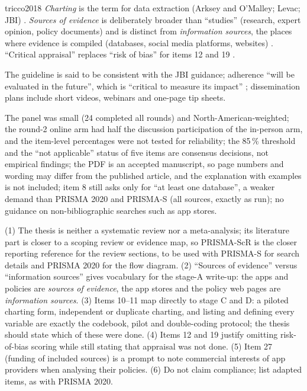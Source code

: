 \begin{papercard}{tricco2018}
 \emph{Charting} is the term for data extraction (Arksey and O'Malley; Levac; JBI) . \emph{Sources of evidence} is deliberately broader than ``studies'' (research, expert opinion, policy documents) and is distinct from \emph{information sources}, the places where evidence is compiled (databases, social media platforms, websites) . ``Critical appraisal'' replaces ``risk of bias'' for items 12 and 19 .

 The guideline is said to be consistent with the JBI guidance; adherence ``will be evaluated in the future'', which is ``critical to measure its impact'' ; dissemination plans include short videos, webinars and one-page tip sheets.

 The panel was small (24 completed all rounds) and North-American-weighted; the round-2 online arm had half the discussion participation of the in-person arm, and the item-level percentages were not tested for reliability; the 85\,\% threshold and the ``not applicable'' status of five items are consensus decisions, not empirical findings; the PDF is an accepted manuscript, so page numbers and wording may differ from the published article, and the explanation with examples is not included; item 8 still asks only for ``at least one database'', a weaker demand than PRISMA 2020 and PRISMA-S (all sources, exactly as run); no guidance on non-bibliographic searches such as app stores.

 (1) The thesis is neither a systematic review nor a meta-analysis; its literature part is closer to a scoping review or evidence map, so PRISMA-ScR is the closer reporting reference for the review sections, to be used with PRISMA-S for search details and PRISMA 2020 for the flow diagram. (2) ``Sources of evidence'' versus ``information sources'' gives vocabulary for the stage-A write-up: the apps and policies are \emph{sources of evidence}, the app stores and the policy web pages are \emph{information sources}. (3) Items 10--11 map directly to stage C and D: a piloted charting form, independent or duplicate charting, and listing and defining every variable are exactly the codebook, pilot and double-coding protocol; the thesis should state which of these were done. (4) Items 12 and 19 justify omitting risk-of-bias scoring while still stating that appraisal was not done. (5) Item 27 (funding of included sources) is a prompt to note commercial interests of app providers when analysing their policies. (6) Do not claim compliance; list adapted items, as with PRISMA 2020.
\end{papercard}
